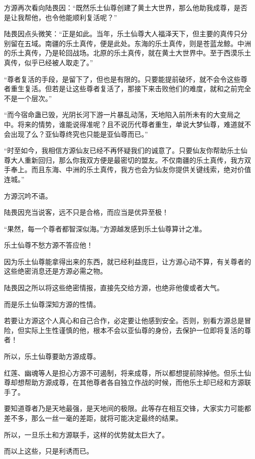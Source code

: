 \begin{this_body}
方源再次看向陆畏因：“既然乐土仙尊创建了黄土大世界，那么他助我成尊，是否是让我帮他，也令他能顺利复活呢？”

陆畏因点头微笑：“正是如此。当年，乐土仙尊大人福泽天下，但主要的真传只分别留在五域。南疆的乐土真传，便是此处。东海的乐土真传，则是苍蓝龙鲸。中洲的乐土真传，乃是轮回战场。北原的乐土真传，就在黄土大世界中。至于西漠乐土真传，似乎已经被人取走了。”

“尊者复活的手段，是留下了，但也是有限的。只要能提前破坏，就不会令这些尊者重生复活。但若是让这些尊者复活了，那接下来击败他们的难度，就和之前完全不是一个层次。”

“而今宿命蛊已毁，光阴长河下游一片暴乱动荡，天地陷入前所未有的大变局之中。将来的情势，谁能说得准呢？且不说历代尊者重生，单说大梦仙尊，难道就不会出现了么？亚仙尊终究也只能是亚仙尊而已。”

“时至如今，我相信方源仙友已经不再怀疑我们的诚意了。只要仙友你帮助乐土仙尊大人重新回归，那么你我双方便是最密切的盟友。不仅南疆的乐土真传，我方双手奉上。而且东海、中洲的乐土真传，我方也会为仙友你提供关键线索，绝对价值连城。”

方源沉吟不语。

陆畏因充当说客，远不只是合格，而应当是优异至极！

“果然，每一个尊者都智深似海。”方源越发感到乐土仙尊算计之准。

乐土仙尊不愁方源不答应他！

因为乐土仙尊能拿得出来的东西，就已经利益庞巨，让方源心动不算，有关尊者的这些绝密消息还是方源必需之物。

陆畏因之所以将这些绝密情报，直接先交给方源，也绝非他傻或者大气。

而是乐土仙尊深知方源的性情。

若要让方源这个人真心和自己合作，必定要让他感到安全。否则，别看方源总是冒险，但实际上生性谨慎的他，根本不会以亚仙尊的身份，去保护一位即将复活的尊者！

所以，乐土仙尊要助方源成尊。

红莲、幽魂等人是担心方源不可遏制，将来成尊，所以都想提前除掉他。但乐土仙尊却想帮助方源成尊，在其他尊者各自独立作战的时候，而他乐土却已经和方源联手了。

要知道尊者乃是天地最强，是天地间的极限。此等存在相互交锋，大家实力可能都差不多，那么一丝一毫的差距，就将可能决定最终的结果。

所以，一旦乐土和方源联手，这样的优势就太巨大了。

而以上这些，只是利诱而已。


\end{this_body}
